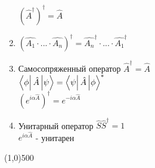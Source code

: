 \begin{enumerate}
      $ (\hat{A}^\dagger)^\dagger = \hat{A} $
\item $ (\hat{A_1} \cdot ... \cdot \hat{A_n})^\dagger = \hat{A_n}^\dagger \cdot ... \cdot \hat{A_1}^\dagger $
\item Самосопряженный оператор $\hat{A}^\dagger = \hat{A} $\\
      $ \matrixel{\phi}{\hat{A}}{\psi} = \matrixel{\psi}{\hat{A}}{\phi}^* $\\
      $ (e^{i\alpha\hat{A}})^\dagger = e^{-i\alpha\hat{A}} $
\item Унитарный оператор $ \hat{S}\hat{S}^\dagger = 1 $\\
      $ e^{i\alpha\hat{A}} $ - унитарен
\end{enumerate}
\line(1,0){500}
\vfill \hfill {}
